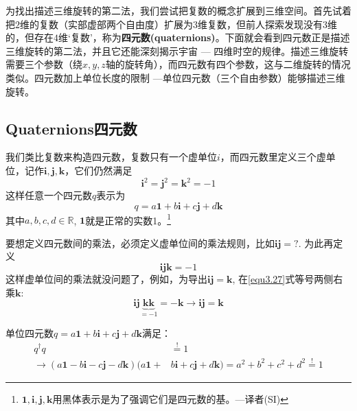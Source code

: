 为找出描述三维旋转的第二法，我们尝试把复数的概念扩展到三维空间。首先试着把$2$维的复数（实部虚部两个自由度）扩展为$3$维复数，但前人探索发现没有$3$维的，但存在$4$维‘复数’，称为{\bf 四元数(quaternions)}。下面就会看到四元数正是描述三维旋转的第二法，并且它还能深刻揭示宇宙 --- 四维时空的规律。描述三维旋转需要三个参数（绕$x,y,z$轴的旋转角），而四元数有四个参数，这与二维旋转的情况类似。四元数加上单位长度的限制 ---单位四元数（三个自由参数）能够描述三维旋转。

\subsection[四元数]{Quaternions\quad 四元数}
\label{sec3.3.1}
我们类比复数来构造四元数，复数只有一个虚单位$i$，而四元数里定义三个虚单位，记作$\mathbf{i,j,k}$，它们仍然满足
\begin{equation}
\label{equ3.25}
\mathbf{i}^2 = \mathbf{j}^2 = \mathbf{k}^2 = -1
\end{equation}
这样任意一个四元数$q$表示为
\begin{equation}
\label{equ3.26}
q = a\mathbf{1} + b\mathbf{i} + c\mathbf{j} + d\mathbf{k}
\end{equation}
其中$a, b, c, d \in \mathbb{R}$, $\mathbf{1}$就是正常的实数1。\footnote{$\mathbf{1,i,j,k}$用黑体表示是为了强调它们是四元数的基。---译者(SI)}

要想定义四元数间的乘法，必须定义虚单位间的乘法规则，比如$\mathbf{ij} = ?$. 为此再定义
\begin{equation}
\label{equ3.27}
\mathbf{ijk} = -1
\end{equation}
这样虚单位间的乘法就没问题了，例如，为导出$\mathbf{ij} = \mathbf{k}$, 在\ref{equ3.27}式等号两侧右乘$\mathbf{k}$:
\begin{equation}
\label{equ3.28}
\mathbf{ij} \underbrace{\mathbf{kk}}_{= -1} = -\mathbf{k} \rightarrow \mathbf{ij} = \mathbf{k}
\end{equation}

单位四元数$q = a\mathbf{1} + b\mathbf{i} + c\mathbf{j} + d\mathbf{k}$满足：
\begin{align}
q^\dag q &\stackrel{!}{=} 1 \nonumber\\
\label{equ3.29}
\rightarrow (a\mathbf{1} - b\mathbf{i} - c\mathbf{j} - d\mathbf{k}) (a\mathbf{1} +& b\mathbf{i} + c\mathbf{j} + d\mathbf{k}) = a^2 + b^2 + c^2 + d^2 \stackrel{!}{=} 1
\end{align}

